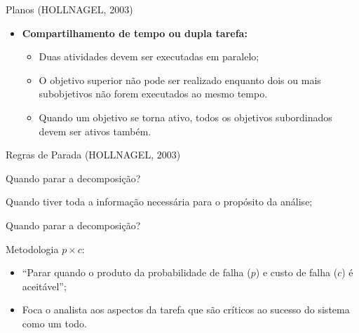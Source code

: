 \documentclass[xcolor=dvipsnames]{beamer}
\newcommand{\aspas}[1]{``#1''}
\let\olditem=\item%
\renewcommand{\item}{\olditem \justifying}%
\begin{document}
\begin{frame}{Planos (HOLLNAGEL, 2003)}

	\begin{itemize}
    
		\item \textbf{Compartilhamento de tempo ou dupla tarefa:}
        
        	\bigskip
            
			\begin{itemize}
            
				\item Duas atividades devem ser executadas em paralelo;
                
                \bigskip
                
				\item O objetivo superior não pode ser realizado enquanto dois ou mais subobjetivos não forem executados ao mesmo tempo.
                
                \bigskip
                
				\item Quando um objetivo se torna ativo, todos os objetivos subordinados devem ser ativos também.
                
			\end{itemize}
            
	\end{itemize}
    
\end{frame}



\begin{frame}{Regras de Parada (HOLLNAGEL, 2003)}

	\begin{block}{Quando parar a decomposição?}
    
		Quando tiver toda a informação necessária para o propósito da análise;

	\end{block}
    
    \pause    
    
    \begin{block}{Quando parar a decomposição?}
    
        
		Metodologia $p \times c$:
            
			\begin{itemize}
            
				\item \aspas{Parar quando o produto da probabilidade de falha ($p$) e custo de falha ($c$) é aceitável};
                
                \bigskip
                
				\item Foca o analista aos aspectos da tarefa que são críticos ao sucesso do sistema como um todo.
                
			\end{itemize}

	\end{block}
    
\end{frame}
\end{document}
